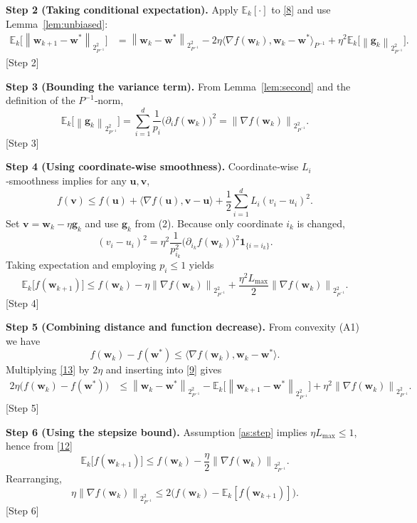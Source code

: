 \documentclass{article}
\newcommand{\E}{\mathbb{E}}
\newcommand{\ip}[2]{\langle #1,#2\rangle}
\newcommand{\norm}[2][2]{\left\lVert #2\right\rVert_{#1}}
\newcommand{\grad}{\nabla}
\begin{document}
\noindent\textbf{Step 2 (Taking conditional expectation).}  
Apply $\E_k[\cdot]$ to \eqref{8} and use Lemma~\ref{lem:unbiased}:
\begin{align}
\E_k\!\big[\norm{\mathbf{w}_{k+1}-\mathbf{w}^{*}}_{P^{-1}}^{2}\big]
&= \norm{\mathbf{w}_{k}-\mathbf{w}^{*}}_{P^{-1}}^{2}
   -2\eta\ip{\grad f(\mathbf{w}_{k})}{\mathbf{w}_{k}-\mathbf{w}^{*}}_{P^{-1}}
   +\eta^{2}\E_k\!\big[\norm{\mathbf{g}_k}_{P^{-1}}^{2}\big].
\tag{9}
\end{align}
[Step 2]

\noindent\textbf{Step 3 (Bounding the variance term).}  
From Lemma~\ref{lem:second} and the definition of the $P^{-1}$‑norm,
\[
\E_k\!\big[\norm{\mathbf{g}_k}_{P^{-1}}^{2}\big]
= \sum_{i=1}^{d}\frac{1}{p_i}\big(\partial_i f(\mathbf{w}_{k})\big)^{2}
= \norm{\grad f(\mathbf{w}_{k})}_{P^{-1}}^{2}.
\tag{10}
\]
[Step 3]

\noindent\textbf{Step 4 (Using coordinate‑wise smoothness).}  
Coordinate‑wise $L_i$‑smoothness implies for any $\mathbf{u},\mathbf{v}$,
\[
f(\mathbf{v})\le f(\mathbf{u})+\ip{\grad f(\mathbf{u})}{\mathbf{v}-\mathbf{u}}
      +\frac12\sum_{i=1}^{d}L_i (v_i-u_i)^{2}.
\tag{11}
\]
Set $\mathbf{v}=\mathbf{w}_{k}-\eta\mathbf{g}_k$ and use $\mathbf{g}_k$ from (2). Because only coordinate $i_k$ is changed,
\[
(v_i-u_i)^{2}= \eta^{2}\frac{1}{p_{i_k}^{2}}\big(\partial_{i_k}f(\mathbf{w}_{k})\big)^{2}\mathbf{1}_{\{i=i_k\}} .
\]
Taking expectation and employing $p_i\le 1$ yields
\[
\E_k\!\big[f(\mathbf{w}_{k+1})\big]
\le f(\mathbf{w}_{k})-\eta\norm{\grad f(\mathbf{w}_{k})}_{P^{-1}}^{2}
    +\frac{\eta^{2}L_{\max}}{2}\norm{\grad f(\mathbf{w}_{k})}_{P^{-1}}^{2}.
\tag{12}
\]
[Step 4]

\noindent\textbf{Step 5 (Combining distance and function decrease).}  
From convexity (A1) we have
\[
f(\mathbf{w}_{k})-f(\mathbf{w}^{*})\le
\ip{\grad f(\mathbf{w}_{k})}{\mathbf{w}_{k}-\mathbf{w}^{*}} .
\tag{13}
\]
Multiplying \eqref{13} by $2\eta$ and inserting into \eqref{9} gives
\begin{align}
2\eta\big(f(\mathbf{w}_{k})-f(\mathbf{w}^{*})\big)
&\le
\norm{\mathbf{w}_{k}-\mathbf{w}^{*}}_{P^{-1}}^{2}
-\E_k\!\big[\norm{\mathbf{w}_{k+1}-\mathbf{w}^{*}}_{P^{-1}}^{2}\big]
+\eta^{2}\norm{\grad f(\mathbf{w}_{k})}_{P^{-1}}^{2}.
\tag{14}
\end{align}
[Step 5]

\noindent\textbf{Step 6 (Using the stepsize bound).}  
Assumption \ref{as:step} implies $\eta L_{\max}\le1$, hence from \eqref{12}
\[
\E_k\!\big[f(\mathbf{w}_{k+1})\big]
\le f(\mathbf{w}_{k})-\frac{\eta}{2}\norm{\grad f(\mathbf{w}_{k})}_{P^{-1}}^{2}.
\tag{15}
\]
Rearranging,
\[
\eta\norm{\grad f(\mathbf{w}_{k})}_{P^{-1}}^{2}
\le 2\big(f(\mathbf{w}_{k})-\E_k[f(\mathbf{w}_{k+1})]\big).
\tag{16}
\]
[Step 6]
\end{document}
